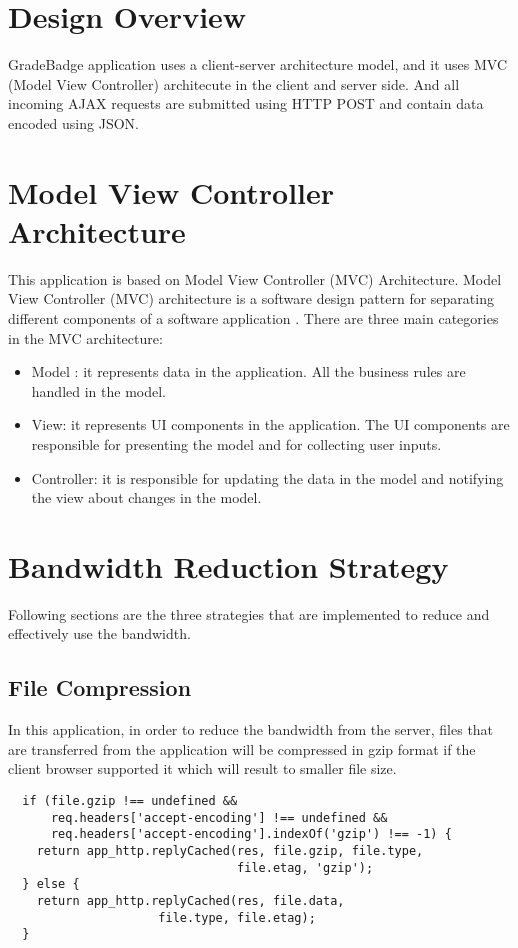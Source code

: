 
\section{Design Overview}
GradeBadge application uses a client-server architecture model, and it uses MVC (Model View Controller) architecute in the client and server side. And all incoming AJAX requests are submitted using HTTP POST and contain data encoded using JSON.    

\section{Model View Controller Architecture}
This application is based on Model View Controller (MVC) Architecture. Model View Controller (MVC) architecture is a software design pattern for separating different components of a software application \cite{MVC}. There are three main categories in the MVC architecture:

\begin{itemize}
\item Model : it represents data in the application. All the business rules are handled in the model.
\item View: it represents UI components in the application. The UI components are responsible for presenting the model and for collecting user inputs.
\item Controller: it is responsible for updating the data in the model and notifying the view about changes in the model.
\end{itemize}

\section{Bandwidth Reduction Strategy}
Following sections are the three strategies that are implemented to reduce and effectively use the bandwidth.  

\subsection{File Compression}
In this application, in order to reduce the bandwidth from the server, files that are transferred from the application  will be compressed in gzip format if the client browser supported it which will result to smaller file size. 

\begin{lstlisting}
  if (file.gzip !== undefined && 
      req.headers['accept-encoding'] !== undefined && 
      req.headers['accept-encoding'].indexOf('gzip') !== -1) {
    return app_http.replyCached(res, file.gzip, file.type, 
                                file.etag, 'gzip');
  } else {
    return app_http.replyCached(res, file.data, 
                     file.type, file.etag);
  }
\end{lstlisting}

